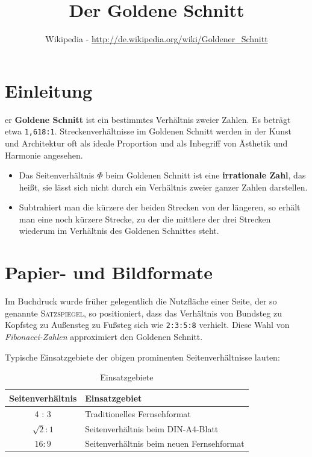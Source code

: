 \documentclass[10pt]{scrartcl}
\title{ {\calligra Der Goldene Schnitt}}
\author{Wikipedia - {\small \url{http://de.wikipedia.org/wiki/Goldener_Schnitt}}}
\date{}
\begin{document}
\maketitle	

\newpage
\setcounter{tocdepth}{2}
\renewcommand\contentsname{Inhaltsverzeichnis}
\tableofcontents

\newpage
\section{Einleitung}
\label{sec:Einleitung}

{\LARGE {}}er \textbf{Goldene Schnitt} ist ein bestimmtes Verhältnis zweier Zahlen. Es beträgt etwa \texttt{1,618:1}.
Streckenverhältnisse im Goldenen Schnitt werden in der Kunst und Architektur oft als ideale Proportion und als Inbegriff von Ästhetik und Harmonie angesehen.

\begin{itemize}
	\item Das Seitenverhältnis \textbf{$\Phi$} beim Goldenen Schnitt ist eine \textbf{irrationale Zahl}, das heißt, sie lässt sich nicht durch ein Verhältnis zweier ganzer Zahlen darstellen. 
\item Subtrahiert man die kürzere der beiden Strecken von der längeren, so erhält man eine noch kürzere Strecke, zu der die mittlere der drei Strecken wiederum im Verhältnis des Goldenen Schnittes steht.
\end{itemize}

\section{Papier- und Bildformate}
\label{sec:PapierUndBildformate}

Im Buchdruck wurde früher gelegentlich die Nutzfläche einer Seite, 
der so genannte \textsc{Satzspiegel}, so positioniert, dass das Verhältnis von Bundsteg zu Kopfsteg zu Außensteg zu Fußsteg sich wie \texttt{2:3:5:8} verhielt.
Diese Wahl von \emph{Fibonacci-Zahlen} approximiert den Goldenen Schnitt.

Typische Einsatzgebiete der obigen prominenten Seitenverhältnisse lauten:

\begin{table}[htb]
\begin{center}

\begin{tabular} { | c | l|}
\hline
\textbf{Seitenverhältnis}   & \textbf{Einsatzgebiet}   \\ \hline
4 : 3              & Traditionelles Fernsehformat   \\ \hline
$\sqrt{2} : 1$     & Seitenverhältnis beim DIN-A4-Blatt \\   \hline
$16: 9 $            & Seitenverhältnis beim neuen Fernsehformat \\ 
\hline

\end{tabular}
	\caption{Einsatzgebiete}
	\label{tab:Einsatzgebiete}
\end{center}
\end{table} 
\end{document}
